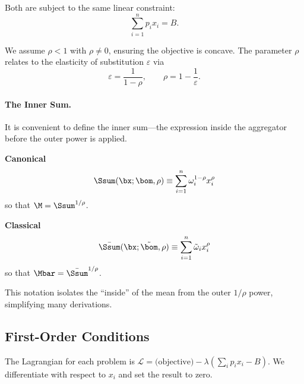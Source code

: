 \medskip
\noindent
Both are subject to the same linear constraint:
\begin{equation}
\sum_{i=1}^{n} p_i x_i = B.
\label{eq:budget}
\end{equation}

We assume $\rho < 1$ with $\rho \neq 0$, ensuring the objective is concave. The parameter $\rho$ relates to the elasticity of substitution $\varepsilon$ via
\begin{equation}
\varepsilon = \frac{1}{1-\rho}, \qquad \rho = 1 - \frac{1}{\varepsilon}.
\label{eq:rho-epsilon}
\end{equation}

\paragraph{The Inner Sum.}
It is convenient to define the inner sum---the expression inside the aggregator before the outer power is applied.

\medskip
\noindent
\begin{minipage}[t]{0.48\textwidth}
\centering\textbf{Canonical}
\begin{equation}
\Ssum(\bx; \bom, \rho) \equiv \sum_{i=1}^{n} \omega_i^{1-\rho} x_i^\rho
\label{eq:inner-canonical}
\end{equation}
so that $\M = \Ssum^{1/\rho}$.
\end{minipage}%
\hfill
\begin{minipage}[t]{0.48\textwidth}
\centering\textbf{Classical}
\begin{equation}
\bar{\Ssum}(\bx; \tilde{\bom}, \rho) \equiv \sum_{i=1}^{n} \tilde{\omega}_i x_i^\rho
\label{eq:inner-classical}
\end{equation}
so that $\Mbar = \bar{\Ssum}^{1/\rho}$.
\end{minipage}

\medskip
\noindent
This notation isolates the ``inside'' of the mean from the outer $1/\rho$ power, simplifying many derivations.

\subsection{First-Order Conditions}
\label{subsec:foc}

The Lagrangian for each problem is $\mathcal{L} = \text{(objective)} - \lambda(\sum_i p_i x_i - B)$. We differentiate with respect to $x_i$ and set the result to zero.

